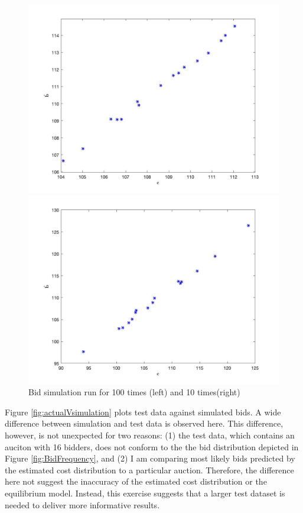 \documentclass[11pt]{article}
\begin{document}
\begin{figure}
\centering
    \begin{minipage}[h]{0.5\textwidth}
        \centering 
        \includegraphics[width=\linewidth]{100run.jpg}
    \end{minipage}%
    \begin{minipage}[h]{0.5\textwidth}
        \centering
        \includegraphics[width=\linewidth]{10run.jpg}
    \end{minipage}
\caption{Bid simulation run for 100 times (left) and 10 times(right)}
\label{fig:simulation_run_times}
\end{figure}

Figure \ref{fig:actualVsimulation} plots test data against simulated bids. 
A wide difference between simulation and test data is observed here. 
This difference, however, is not unexpected for two reasons: 
(1) the test data, which contains an auciton with 16 bidders, does not conform 
to the the bid distribution depicted in Figure \ref{fig:BidFrequency}, and 
(2) I am comparing most likely bids predicted by the estimated cost distribution 
to a particular auction. Therefore, the difference here not suggest the 
inaccuracy of the estimated cost distribution or the equilibrium model. 
Instead, this exercise suggests that a larger test dataset is needed 
to deliver more informative results. 
\end{document}
